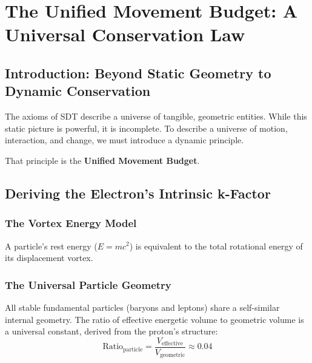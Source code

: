 \chapter{The Unified Movement Budget: A Universal Conservation Law}

\author{James Tyndall}

\section{Introduction: Beyond Static Geometry to Dynamic Conservation}

The axioms of SDT describe a universe of tangible, geometric entities.  While this static picture is powerful, it is incomplete.  To describe a universe of motion, interaction, and change, we must introduce a dynamic principle.

That principle is the \textbf{Unified Movement Budget}.


\section{Deriving the Electron's Intrinsic k-Factor}

\subsection{The Vortex Energy Model}

A particle's rest energy ($E = mc^2$) is equivalent to the total rotational energy of its displacement vortex.

\subsection{The Universal Particle Geometry}

All stable fundamental particles (baryons and leptons) share a self-similar internal geometry.  The ratio of effective energetic volume to geometric volume is a universal constant, derived from the proton's structure:
\begin{equation}\label{eq:ratio}
  \text{Ratio}_{\text{particle}} = \frac{V_{\text{effective}}}{V_{\text{geometric}}} \approx 0.04
\end{equation}

